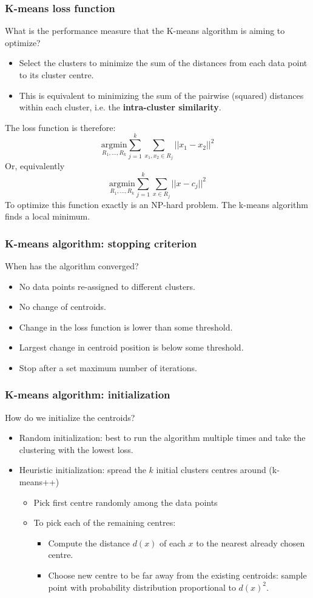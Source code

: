 \documentclass[11pt]{article}
\begin{document}
\subsubsection{K-means loss function}
What is the performance measure that the K-means algorithm is aiming to optimize?
\begin{itemize}
    \item Select the clusters to minimize the sum of the distances from each data point to its cluster centre.
    \item This is equivalent to minimizing the sum of the pairwise (squared) distances within each cluster, i.e. the \textbf{intra-cluster similarity}.
\end{itemize}
The loss function is therefore:
$$
\underset{R_1,\dots,R_k}{\text{argmin}}\sum_{j=1}^{k}\sum_{x_1,x_2\in R_j}||x_1-x_2||^2
$$
Or, equivalently
$$
\underset{R_1,\dots,R_k}{\text{argmin}}\sum_{j=1}^{k}\sum_{x\in R_j}||x-c_j||^2
$$
To optimize this function exactly is an NP-hard problem. The k-means algorithm finds a local minimum.
\subsubsection{K-means algorithm: stopping criterion}
When has the algorithm converged?
\begin{itemize}
    \item No data points re-assigned to different clusters.
    \item No change of centroids.
    \item Change in the loss function is lower than some threshold.
    \item Largest change in centroid position is below some threshold.
    \item Stop after a set maximum number of iterations.
\end{itemize}
\subsubsection{K-means algorithm: initialization}
How do we initialize the centroids?
\begin{itemize}
    \item Random initialization: best to run the algorithm multiple times and take the clustering with the lowest loss.
    \item Heuristic initialization: spread the $k$ initial clusters centres around (k-means++)
    \begin{itemize}
        \item Pick first centre randomly among the data points
        \item To pick each of the remaining centres:
        \begin{itemize}
            \item Compute the distance $d(x)$ of each $x$ to the nearest already chosen centre.
            \item Choose new centre to be far away from the existing centroids: sample point with probability distribution proportional to $d(x)^2$.
        \end{itemize}
    \end{itemize}
\end{itemize}
\end{document}
